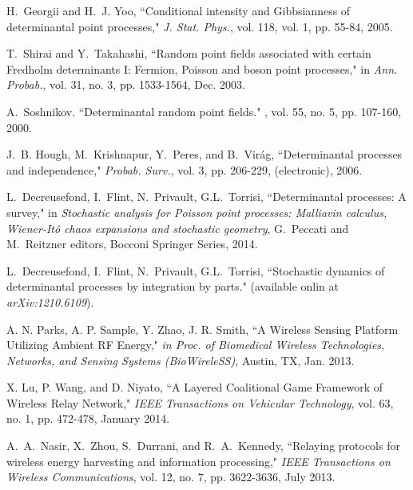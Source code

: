 \documentclass[12pt,draftclsnofoot,onecolumn]{IEEEtran}
\begin{document}
\begin{thebibliography}{99}
H.~Georgii and H.~J. Yoo, ``Conditional intensity and Gibbsianness of determinantal point processes," {\em J. Stat. Phys.}, vol. 118, vol. 1, pp. 55-84, 2005.

T.~Shirai and Y.~Takahashi, ``Random point fields associated with certain Fredholm determinants I: Fermion, Poisson and boson point processes," in {\em Ann. Probab.}, vol. 31, no. 3, pp. 1533-1564, Dec. 2003.

A.~Soshnikov. \newblock ``Determinantal random point fields." , vol. 55, no. 5, pp. 107-160, 2000.


J.~B. Hough, M.~Krishnapur, Y.~Peres, and B.~Vir{\'a}g, ``Determinantal processes and independence," {\em Probab. Surv.}, vol. 3, pp. 206-229, (electronic), 2006.

L.~Decreusefond, I.~Flint, N.~Privault, G.L.~Torrisi, ``Determinantal processes: A survey," in {\em Stochastic analysis for Poisson point processes: Malliavin calculus, Wiener-It\^o chaos expansions and stochastic geometry}, G.~Peccati and M.~Reitzner editors, Bocconi  Springer Series, 2014.

L.~Decreusefond, I.~Flint, N.~Privault, G.L.~Torrisi, ``Stochastic dynamics of determinantal processes by integration by parts."  (available onlin at {\em arXiv:1210.6109}).

A. N. Parks, A. P. Sample, Y. Zhao, J. R. Smith, ``A Wireless Sensing
Platform Utilizing Ambient RF Energy," \emph{in Proc. of Biomedical Wireless Technologies, Networks, and Sensing Systems (BioWireleSS)}, Austin, TX, Jan. 2013.

X. Lu, P. Wang, and D. Niyato, ``A Layered Coalitional Game Framework of Wireless Relay Network," \emph{IEEE Transactions on Vehicular Technology}, vol. 63, no. 1, pp. 472-478, January 2014. 


A.~A.~Nasir, X.~Zhou, S.~Durrani, and R.~A.~Kennedy, ``Relaying protocols for wireless energy harvesting and information processing," \emph{IEEE Transactions on Wireless Communications}, vol. 12, no. 7, pp. 3622-3636, July 2013.


 








 


















 


 


\end{thebibliography}


 
\end{document}
